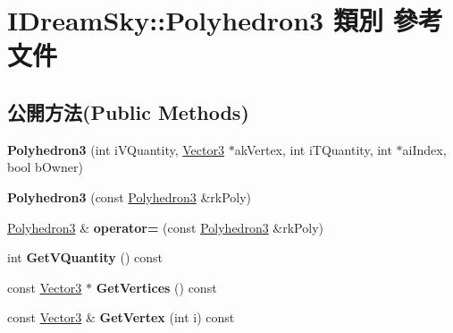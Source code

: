\hypertarget{class_i_dream_sky_1_1_polyhedron3}{}\section{I\+Dream\+Sky\+:\+:Polyhedron3 類別 參考文件}
\label{class_i_dream_sky_1_1_polyhedron3}
\subsection*{公開方法(Public Methods)}
\begin{DoxyCompactItemize}
\item 
{\bfseries Polyhedron3} (int i\+V\+Quantity, \hyperlink{class_i_dream_sky_1_1_vector3}{Vector3} $\ast$ak\+Vertex, int i\+T\+Quantity, int $\ast$ai\+Index, bool b\+Owner)\hypertarget{class_i_dream_sky_1_1_polyhedron3_a597b3c62411632b0b7ec097f187aedba}{}\label{class_i_dream_sky_1_1_polyhedron3_a597b3c62411632b0b7ec097f187aedba}

\item 
{\bfseries Polyhedron3} (const \hyperlink{class_i_dream_sky_1_1_polyhedron3}{Polyhedron3} \&rk\+Poly)\hypertarget{class_i_dream_sky_1_1_polyhedron3_adef375042667395797400f6aee73c576}{}\label{class_i_dream_sky_1_1_polyhedron3_adef375042667395797400f6aee73c576}

\item 
\hyperlink{class_i_dream_sky_1_1_polyhedron3}{Polyhedron3} \& {\bfseries operator=} (const \hyperlink{class_i_dream_sky_1_1_polyhedron3}{Polyhedron3} \&rk\+Poly)\hypertarget{class_i_dream_sky_1_1_polyhedron3_aa4ceab55c6b3b63dfed4a97dc95f670c}{}\label{class_i_dream_sky_1_1_polyhedron3_aa4ceab55c6b3b63dfed4a97dc95f670c}

\item 
int {\bfseries Get\+V\+Quantity} () const \hypertarget{class_i_dream_sky_1_1_polyhedron3_ad1b59fc9105e3780b4234ac37b2291d5}{}\label{class_i_dream_sky_1_1_polyhedron3_ad1b59fc9105e3780b4234ac37b2291d5}

\item 
const \hyperlink{class_i_dream_sky_1_1_vector3}{Vector3} $\ast$ {\bfseries Get\+Vertices} () const \hypertarget{class_i_dream_sky_1_1_polyhedron3_a27e95ee971e116489c781a0767ad54b9}{}\label{class_i_dream_sky_1_1_polyhedron3_a27e95ee971e116489c781a0767ad54b9}

\item 
const \hyperlink{class_i_dream_sky_1_1_vector3}{Vector3} \& {\bfseries Get\+Vertex} (int i) const \hypertarget{class_i_dream_sky_1_1_polyhedron3_a20deb551ce84982c3beac83ecfe72c38}{}\label{class_i_dream_sky_1_1_polyhedron3_a20deb551ce84982c3beac83ecfe72c38}


\end{DoxyCompactItemize}
